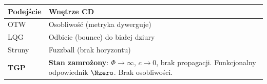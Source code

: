 \begin{center}
\begin{tabular}{@{}>{\raggedright}p{2.5cm}p{11cm}@{}}
\toprule
\textbf{Podej\'scie} & \textbf{Wn\k{e}trze CD} \\
\midrule
OTW & Osobliwo\'s\'c (metryka dywerguje) \\
LQG & Odbicie (bounce) do bia\l{}ej dziury \\
Struny & Fuzzball (brak horyzontu) \\
\textbf{TGP} & \textbf{Stan zamro\.zony}: $\Phi \to \infty$,
  $c \to 0$, brak propagacji. Funkcjonalny odpowiednik
  $\Nzero$. Brak osobliwo\'sci. \\
\bottomrule
\end{tabular}
\end{center}
